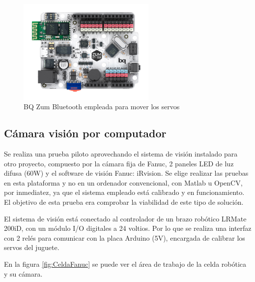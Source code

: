 \begin{figure}
\centering
\includegraphics[width=0.6\textwidth]{Figures/BQZUM}
\caption[BQ Zum Bluetooth empleada para mover los servos]{BQ Zum Bluetooth empleada para mover los servos}
\label{fig:BQZUM}
\end{figure}


\subsection{Cámara visión por computador}

Se realiza una prueba piloto aprovechando el sistema de visión instalado para otro proyecto, compuesto por la cámara fija de Fanuc, 2 paneles LED de luz difusa (60W) y el software de visión Fanuc: iRvision. Se elige realizar las pruebas en esta plataforma y no en un ordenador convencional, con Matlab u OpenCV, por inmediatez, ya que el sistema empleado está calibrado y en funcionamiento. El objetivo de esta prueba era comprobar la viabilidad de este tipo de solución.

El sistema de visión está conectado al controlador de un brazo robótico LRMate 200iD, con un módulo I/O digitales a 24 voltios. Por lo que se realiza una interfaz con 2 relés para comunicar con la placa Arduino (5V), encargada de calibrar los servos del juguete.

En la figura \ref{fig:CeldaFanuc} se puede ver el área de trabajo de la celda robótica y su cámara.

